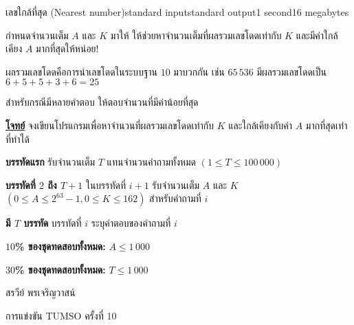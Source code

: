 \documentclass[11pt,a4paper]{article}
\begin{document}
\begin{problem}{เลขใกล้ที่สุด (Nearest number)}{standard input}{standard output}{1 second}{16 megabytes}

กำหนดจำนวนเต็ม $A$ และ $K$ มาให้ ให้ช่วยหาจำนวนเต็มที่ผลรวมเลขโดดเท่ากับ $K$ และมีค่าใกล้เคียง $A$ มากที่สุดให้หน่อย!

ผลรวมเลขโดดคือการนำเลขโดดในระบบฐาน $10$ มาบวกกัน เช่น $65\,536$ มีผลรวมเลขโดดเป็น $6 + 5 + 5 + 3 + 6 = 25$

สำหรับกรณีมีหลายคำตอบ ให้ตอบจำนวนที่มีค่าน้อยที่สุด

\bigskip
\underline{\textbf{โจทย์}}  จงเขียนโปรแกรมเพื่อหาจำนวนที่ผลรวมเลขโดดเท่ากับ $K$ และใกล้เคียงกับค่า $A$ มากที่สุดเท่าที่ทำได้


\InputFile

\textbf{บรรทัดแรก} รับจำนวนเต็ม $T$ แทนจำนวนคำถามทั้งหมด $(1 \leq T \leq 100\,000)$

\textbf{บรรทัดที่ $2$ ถึง $T + 1$} ในบรรทัดที่ $i+1$ รับจำนวนเต็ม $A$ และ $K$ $(0 \leq A \leq 2^{63} -1, 0 \leq K \leq 162)$ สำหรับคำถามที่ $i$


\OutputFile

\textbf{มี $T$ บรรทัด} บรรทัดที่ $i$ ระบุคำตอบของคำถามที่ $i$

\Examples

\begin{example}
%
\end{example}

\Scoring 

\textbf{$10$\% ของชุดทดสอบทั้งหมด: }$A \leq 1\,000$

\textbf{$30$\% ของชุดทดสอบทั้งหมด: }$T \leq 1\,000$


\Source

สรวีย์ พรเจริญวาสน์

การแข่งขัน TUMSO ครั้งที่ 10

\end{problem}
\end{document}
